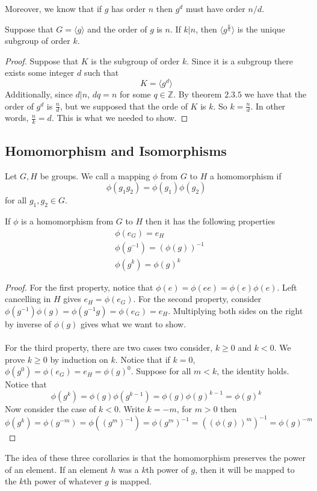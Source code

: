 \documentclass{article}
\begin{document}
Moreover, we know that if $g$ has order $n$ then $g^d$ must have order $n/d$.
\begin{theorem}
    Suppose that $G=\langle g \rangle$ and the order of $g$ is $n$. If $k|n$, then $\langle g^{\frac{n}{k}} \rangle$ is the unique subgroup of order $k$.
\end{theorem}
\begin{proof}
    Suppose that $K$ is the subgroup of order $k$. Since it is a subgroup there exists some integer $d$ such that 
    \[
    K=\langle g^d \rangle
    \] 
    Additionally, since $d|n$, $dq=n$ for some $q\in \mathbb{Z}$. By theorem $2.3.5$ we have that the order of $g^d$ is $\frac{n}{d}$, but we supposed that
    the orde of $K$ is $k$. So $k=\frac{n}{d}$. In other words, $\frac{n}{k}=d$. This is what we needed to show.
\end{proof}
\newpage
\subsection{Homomorphism and Isomorphisms}
Let $G,H$ be groups. We call a mapping $\phi$ from $G$ to $H$ a homomorphism if 
\[
\phi(g_1g_2)=\phi(g_1)\phi(g_2)
\]
for all $g_1,g_2 \in G$.
\begin{theorem}
    If $\phi$ is a homomorphism from $G$ to $H$ then it has the following properties
    \begin{align*}
        &\phi(e_G)=e_H \\
        &\phi(g^{-1})=(\phi(g))^{-1}\\
        &\phi(g^k)= \phi(g)^k
    \end{align*}
\end{theorem}
\begin{proof}
    For the first property, notice that $\phi(e)=\phi(ee)=\phi(e)\phi(e)$. Left cancelling in $H$ gives 
    $e_H=\phi(e_G)$. For the second property, consider $\phi(g^{-1})\phi(g)=\phi(g^{-1}g)=\phi(e_G)=e_H$. Multiplying 
    both sides on the right by inverse of $\phi(g)$ gives what we want to show.
    \\\\
    For the third property, there are two cases two consider, $k\geq 0$ and $k<0$. We prove $k\geq 0$ by induction on $k$. Notice that 
    if $k=0$, $\phi(g^0)=\phi(e_G)=e_H=\phi(g)^0$. Suppose for all $m< k$, the identity holds. Notice that 
    \[
    \phi(g^k)=\phi(g)\phi(g^{k-1})=\phi(g)\phi(g)^{k-1}=\phi(g)^k
    \]
    Now consider the case of $k<0$. Write $k=-m$, for $m>0$ then 
    \[
    \phi(g^k)=\phi(g^{-m})=\phi((g^{m})^{-1})= \phi(g^m)^{-1}= ((\phi(g))^m)^{-1}=\phi(g)^{-m}
    \]
\end{proof}
The idea of these three corollaries is that the homomorphism preserves the power of an element. If an element $h$ was a $k$th power of $g$, then it will be mapped to
the $k$th power of whatever $g$ is mapped.





\end{document}
